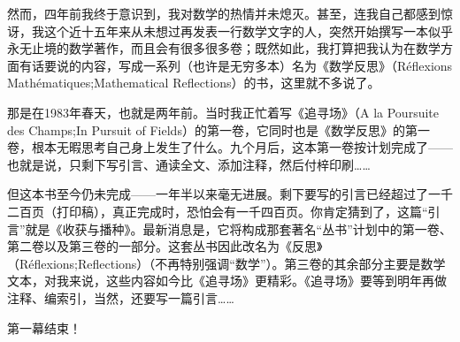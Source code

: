 然而，四年前我终于意识到，我对数学的热情并未熄灭。甚至，连我自己都感到惊讶，我这个近十五年来从未想过再发表一行数学文字的人，突然开始撰写一本似乎永无止境的数学著作，而且会有很多很多卷；既然如此，我打算把我认为在数学方面有话要说的内容，写成一系列（也许是无穷多本）名为《数学反思》（Réflexions Mathématiques;Mathematical Reflections）的书，这里就不多说了。

那是在1983年春天，也就是两年前。当时我正忙着写《追寻场》（A la Poursuite des Champs;In Pursuit of Fields）的第一卷，它同时也是《数学反思》的第一卷，根本无暇思考自己身上发生了什么。九个月后，这本第一卷按计划完成了——也就是说，只剩下写引言、通读全文、添加注释，然后付梓印刷……

但这本书至今仍未完成——一年半以来毫无进展。剩下要写的引言已经超过了一千二百页（打印稿），真正完成时，恐怕会有一千四百页。你肯定猜到了，这篇“引言”就是《收获与播种》。最新消息是，它将构成那套著名“丛书”计划中的第一卷、第二卷以及第三卷的一部分。这套丛书因此改名为《反思》（Réflexions;Reflections）（不再特别强调“数学”）。第三卷的其余部分主要是数学文本，对我来说，这些内容如今比《追寻场》更精彩。《追寻场》要等到明年再做注释、编索引，当然，还要写一篇引言……

第一幕结束！